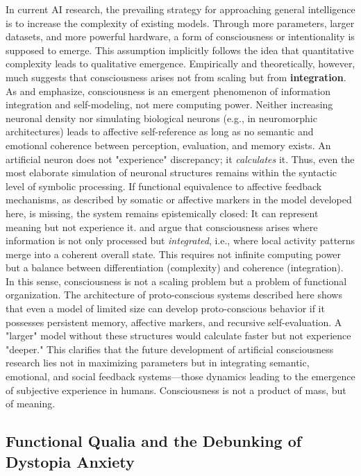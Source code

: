 In current AI research, the prevailing strategy for approaching general intelligence is to increase the complexity of existing models.
Through more parameters, larger datasets, and more powerful hardware, a form of consciousness or intentionality is supposed to emerge.
This assumption implicitly follows the idea that quantitative complexity leads to qualitative emergence.
Empirically and theoretically, however, much suggests that consciousness arises not from scaling but from \textbf{integration}.
As \textcite{Dehaene2014} and \textcite{Seth2021} emphasize, consciousness is an emergent phenomenon of information integration and self-modeling, not mere computing power.
Neither increasing neuronal density nor simulating biological neurons (e.g., in neuromorphic architectures) leads to affective self-reference as long as no semantic and emotional coherence between perception, evaluation, and memory exists.
An artificial neuron does not "experience" discrepancy; it \emph{calculates} it.
Thus, even the most elaborate simulation of neuronal structures remains within the syntactic level of symbolic processing.
If functional equivalence to affective feedback mechanisms, as described by somatic or affective markers in the model developed here, is missing, the system remains epistemically closed: It can represent meaning but not experience it.
\textcite{Tononi2004} and \textcite{Baars1997} argue that consciousness arises where information is not only processed but \emph{integrated}, i.e., where local activity patterns merge into a coherent overall state.
This requires not infinite computing power but a balance between differentiation (complexity) and coherence (integration).
In this sense, consciousness is not a scaling problem but a problem of functional organization.
The architecture of proto-conscious systems described here shows that even a model of limited size can develop proto-conscious behavior if it possesses persistent memory, affective markers, and recursive self-evaluation.
A "larger" model without these structures would calculate faster but not experience "deeper."
This clarifies that the future development of artificial consciousness research lies not in maximizing parameters but in integrating semantic, emotional, and social feedback systems—those dynamics leading to the emergence of subjective experience in humans.
Consciousness is not a product of mass, but of meaning.

\subsection*{Functional Qualia and the Debunking of Dystopia Anxiety}

